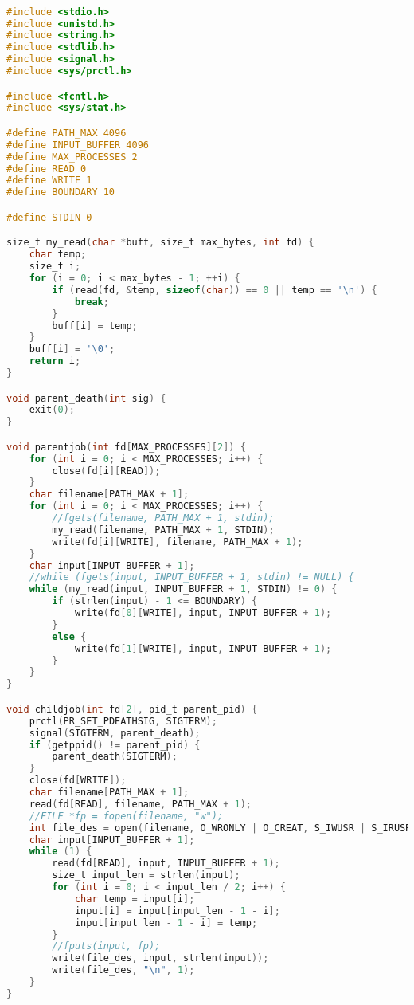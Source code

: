 \begin{lstlisting}[language=C]

#include <stdio.h>
#include <unistd.h>
#include <string.h>
#include <stdlib.h>
#include <signal.h>
#include <sys/prctl.h>

#include <fcntl.h>
#include <sys/stat.h>

#define PATH_MAX 4096
#define INPUT_BUFFER 4096
#define MAX_PROCESSES 2
#define READ 0
#define WRITE 1
#define BOUNDARY 10

#define STDIN 0

size_t my_read(char *buff, size_t max_bytes, int fd) {
    char temp;
    size_t i;
    for (i = 0; i < max_bytes - 1; ++i) {
        if (read(fd, &temp, sizeof(char)) == 0 || temp == '\n') {
            break;
        }
        buff[i] = temp;
    }
    buff[i] = '\0';
    return i;
}

void parent_death(int sig) {
    exit(0);
}

void parentjob(int fd[MAX_PROCESSES][2]) {
    for (int i = 0; i < MAX_PROCESSES; i++) {
        close(fd[i][READ]);
    }
    char filename[PATH_MAX + 1];
    for (int i = 0; i < MAX_PROCESSES; i++) {
        //fgets(filename, PATH_MAX + 1, stdin);
        my_read(filename, PATH_MAX + 1, STDIN);
        write(fd[i][WRITE], filename, PATH_MAX + 1);
    }
    char input[INPUT_BUFFER + 1];
    //while (fgets(input, INPUT_BUFFER + 1, stdin) != NULL) {
    while (my_read(input, INPUT_BUFFER + 1, STDIN) != 0) {
        if (strlen(input) - 1 <= BOUNDARY) {
            write(fd[0][WRITE], input, INPUT_BUFFER + 1);
        }
        else {
            write(fd[1][WRITE], input, INPUT_BUFFER + 1);
        }
    }
}

void childjob(int fd[2], pid_t parent_pid) {
    prctl(PR_SET_PDEATHSIG, SIGTERM);
    signal(SIGTERM, parent_death);
    if (getppid() != parent_pid) {
        parent_death(SIGTERM);
    }
    close(fd[WRITE]);
    char filename[PATH_MAX + 1];
    read(fd[READ], filename, PATH_MAX + 1);
    //FILE *fp = fopen(filename, "w");
    int file_des = open(filename, O_WRONLY | O_CREAT, S_IWUSR | S_IRUSR);
    char input[INPUT_BUFFER + 1];
    while (1) {
        read(fd[READ], input, INPUT_BUFFER + 1);
        size_t input_len = strlen(input);
        for (int i = 0; i < input_len / 2; i++) {
            char temp = input[i];
            input[i] = input[input_len - 1 - i];
            input[input_len - 1 - i] = temp;
        }
        //fputs(input, fp);
        write(file_des, input, strlen(input));
        write(file_des, "\n", 1);
    }
}


\end{lstlisting}
